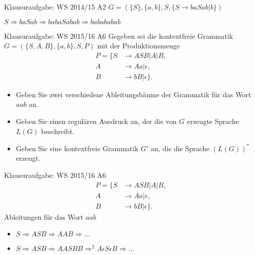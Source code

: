 \begin{frame}{Klausuraufgabe: WS 2014/15 A2}
  $G=(\{S\},\{a,b\},S,\{S\rightarrow baSab | b\})$
  \begin{center}
  \end{center}
  $S\Rightarrow baSab\Rightarrow babaSabab \Rightarrow babababab$
\end{frame}

\begin{frame}{Klausuraufgabe: WS 2015/16 A6}
  Gegeben sei die kontextfreie Grammatik $G=(\{S,A,B\},\{a,b\},S,P)$ mit der Produktionsmenge
  \begin{align*}
    P=\{S&\rightarrow ASB | A | B,\\
    A&\rightarrow Aa | \epsilon,\\
    B&\rightarrow bB | \epsilon\}.
  \end{align*}
  \begin{itemize}
    \item Geben Sie zwei verschiedene Ableitungsbäume der Grammatik für das Wort $aab$ an.
    \item Geben Sie einen regulären Ausdruck an, der die von $G$ erzeugte Sprache $L(G)$ beschreibt.
    \item Geben Sie eine kontextfreie Grammatik $G'$ an, die die Sprache $(L(G))^*$ erzeugt.
  \end{itemize}
\end{frame}

\begin{frame}{Klausuraufgabe: WS 2015/16 A6}
  \begin{align*}
    P=\{S&\rightarrow ASB | A | B,\\
    A&\rightarrow Aa | \epsilon,\\
    B&\rightarrow bB | \epsilon\}.
  \end{align*}
  Ableitungen für das Wort $aab$
  \begin{itemize}
    \pause
    \item $S\Rightarrow ASB \Rightarrow AAB\Rightarrow ...$
    \pause
    \item $S\Rightarrow ASB \Rightarrow AASBB\Rightarrow^2 A\epsilon S\epsilon B\Rightarrow ...$
  \end{itemize}
\end{frame}

